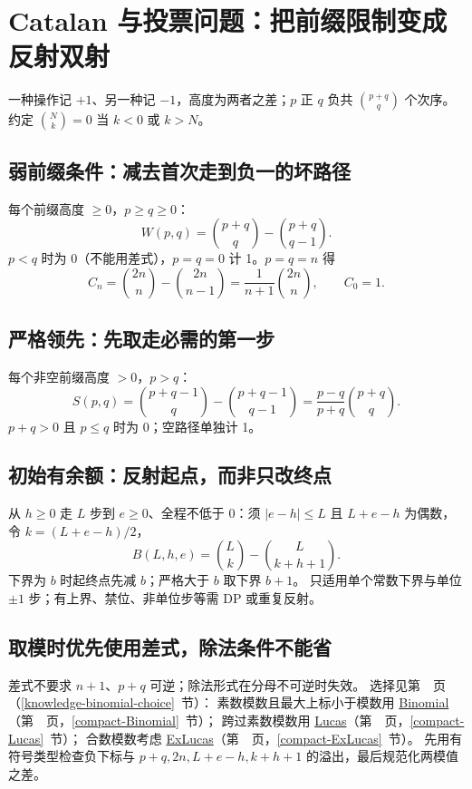 \section{Catalan 与投票问题：把前缀限制变成反射双射}\label{knowledge-ballot-reflection}
一种操作记 $+1$、另一种记 $-1$，高度为两者之差；$p$ 正 $q$ 负共 $\binom{p+q}{q}$ 个次序。
约定 $\binom Nk=0$ 当 $k<0$ 或 $k>N$。

\subsection{弱前缀条件：减去首次走到负一的坏路径}
每个前缀高度 $\ge0$，$p\ge q\ge0$：
\[
W(p,q)=\binom{p+q}{q}-\binom{p+q}{q-1}.
\]
$p<q$ 时为 0（不能用差式），$p=q=0$ 计 1。$p=q=n$ 得
\[
C_n=\binom{2n}{n}-\binom{2n}{n-1}
   =\frac1{n+1}\binom{2n}{n},\qquad C_0=1.
\]

\subsection{严格领先：先取走必需的第一步}
每个非空前缀高度 $>0$，$p>q$：
\[
S(p,q)=\binom{p+q-1}{q}-\binom{p+q-1}{q-1}
      =\frac{p-q}{p+q}\binom{p+q}{q}.
\]
$p+q>0$ 且 $p\le q$ 时为 0；空路径单独计 1。

\subsection{初始有余额：反射起点，而非只改终点}
从 $h\ge0$ 走 $L$ 步到 $e\ge0$、全程不低于 0：须 $|e-h|\le L$ 且 $L+e-h$ 为偶数，令 $k=(L+e-h)/2$，
\[
B(L,h,e)=\binom Lk-\binom L{k+h+1}.
\]
下界为 $b$ 时起终点先减 $b$；严格大于 $b$ 取下界 $b+1$。
只适用单个常数下界与单位 $\pm1$ 步；有上界、禁位、非单位步等需 DP 或重复反射。

\subsection{取模时优先使用差式，除法条件不能省}
差式不要求 $n+1$、$p+q$ 可逆；除法形式在分母不可逆时失效。
选择见第~\pageref{knowledge-binomial-choice}~页（\ref{knowledge-binomial-choice}~节）：
素数模数且最大上标小于模数用
\hyperref[compact-Binomial]{Binomial}（第~\pageref{compact-Binomial}~页，\ref{compact-Binomial}~节）；
跨过素数模数用
\hyperref[compact-Lucas]{Lucas}（第~\pageref{compact-Lucas}~页，\ref{compact-Lucas}~节）；
合数模数考虑
\hyperref[compact-ExLucas]{ExLucas}（第~\pageref{compact-ExLucas}~页，\ref{compact-ExLucas}~节）。
先用有符号类型检查负下标与 $p+q,2n,L+e-h,k+h+1$ 的溢出，最后规范化两模值之差。
